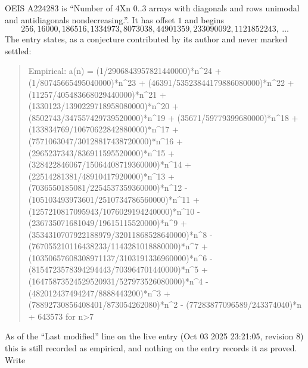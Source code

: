 \documentclass[11pt,a4paper]{article}
\theoremstyle{plain}
\theoremstyle{definition}
\begin{document}
OEIS A224283 is ``Number of 4Xn 0..3 arrays with diagonals and rows unimodal and antidiagonals nondecreasing.''. It has offset $1$ and begins
\[
256, 16000, 186516, 1334973, 8073038, 44901359, 233090092, 1121852243,\ \dots
\]
The entry states, as a conjecture contributed by its author and never marked settled:
\begin{quote}\raggedright\small
Empirical: a(n) = (1/2906843957821440000)*n\^{}24 + (1/80745665495040000)*n\^{}23 + (46391/53523844179886080000)*n\^{}22 + (11257/405483668029440000)*n\^{}21 + (1330123/1390229718958080000)*n\^{}20 + (8502743/347557429739520000)*n\^{}19 + (35671/59779399680000)*n\^{}18 + (133834769/10670622842880000)*n\^{}17 + (7571063047/30128817438720000)*n\^{}16 + (2965237343/836911595520000)*n\^{}15 + (328422846067/15064408719360000)*n\^{}14 + (22514281381/48910417920000)*n\^{}13 + (7036550185081/2254537359360000)*n\^{}12 - (105103493973601/2510734786560000)*n\^{}11 + (1257210817095943/1076029194240000)*n\^{}10 - (236735071681049/19615115520000)*n\^{}9 + (3534310707922188979/32011868528640000)*n\^{}8 - (767055210116438233/1143281018880000)*n\^{}7 + (10350657608308971137/3103191336960000)*n\^{}6 - (8154723578394294443/703964701440000)*n\^{}5 + (16475873524529520931/527973526080000)*n\^{}4 - (482012437494247/8888443200)*n\^{}3 + (78892730856408401/873054262080)*n\^{}2 - (77283877096589/243374040)*n + 643573 for n>7
\end{quote}
As of the ``Last modified'' line on the live entry (Oct 03 2025 23:21:05, revision 8) this is still
recorded as empirical, and nothing on the entry records it as proved. Write
\end{document}
